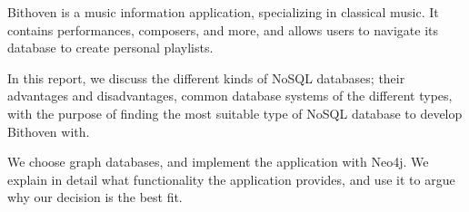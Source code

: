 
Bithoven is a music information application, specializing in classical music. It
contains performances, composers, and more, and allows users to navigate its
database to create personal playlists.

In this report, we discuss the different kinds of NoSQL databases; their
advantages and disadvantages, common database systems of the different types,
with the purpose of finding the most suitable type of NoSQL database to develop
Bithoven with.

We choose graph databases, and implement the application with Neo4j. We explain
in detail what functionality the application provides, and use it to argue why
our decision is the best fit.
